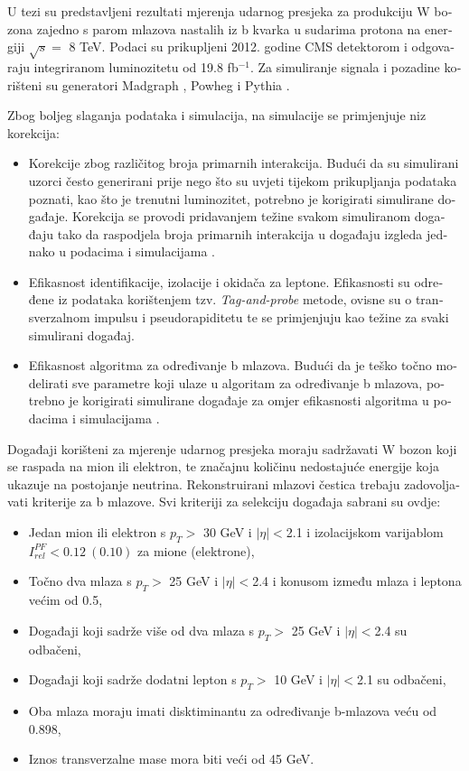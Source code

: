 \begin{otherlanguage}{croatian}
U tezi su predstavljeni rezultati mjerenja udarnog presjeka za produkciju W bozona zajedno s parom mlazova nastalih iz b kvarka u sudarima protona na energiji $\sqrt{s}=$ 8 TeV. Podaci su prikupljeni 2012. godine CMS detektorom i odgovaraju integriranom luminozitetu od 19.8 fb$^{-1}$. Za simuliranje signala i pozadine korišteni su generatori Madgraph \cite{Alwall:2011uj}, Powheg \cite{Oleari:2010nx} i Pythia \cite{Sjostrand:2006za}. 
\par Zbog boljeg slaganja podataka i simulacija, na simulacije se primjenjuje niz korekcija:
\begin{itemize}
\item Korekcije zbog različitog broja primarnih interakcija. Budući da su simulirani uzorci često generirani prije nego što su uvjeti tijekom prikupljanja podataka poznati, kao što je trenutni luminozitet, potrebno je korigirati simulirane događaje. Korekcija se provodi pridavanjem težine svakom simuliranom događaju tako da raspodjela broja primarnih interakcija u događaju izgleda jednako u podacima i simulacijama \cite{CMS:2013wea}.
\item Efikasnost identifikacije, izolacije i okidača za leptone. Efikasnosti su određene iz podataka korištenjem tzv. \textit{Tag-and-probe} metode, ovisne su o transverzalnom impulsu i pseudorapiditetu te se primjenjuju kao težine za svaki simulirani događaj.
\item Efikasnost algoritma za određivanje b mlazova. Budući da je teško točno modelirati sve parametre koji ulaze u algoritam za određivanje b mlazova, potrebno je korigirati simulirane događaje za omjer efikasnosti algoritma u podacima i simulacijama \cite{CMS:2013vea}.
\end{itemize}
\par Događaji korišteni za mjerenje udarnog presjeka moraju sadržavati W bozon koji se raspada na mion ili elektron, te značajnu količinu nedostajuće energije koja ukazuje na postojanje neutrina. Rekonstruirani mlazovi čestica trebaju zadovoljavati kriterije za b mlazove. Svi kriteriji za selekciju događaja sabrani su ovdje:
\begin{itemize}
\item Jedan mion ili elektron s $p_T>$ 30 GeV i $|\eta|<$2.1  i izolacijskom varijablom $I_{rel}^{PF}<0.12\ (0.10)$ za mione (elektrone),
\item Točno dva mlaza s $p_T>$ 25 GeV i $|\eta|<$2.4 i konusom između mlaza i leptona većim od 0.5,
\item Događaji koji sadrže više od dva mlaza s $p_T>$ 25 GeV i $|\eta|<$2.4 su odbačeni,
\item Događaji koji sadrže dodatni lepton s $p_T>$ 10 GeV i $|\eta|<$2.1 su odbačeni,
\item Oba mlaza moraju imati disktiminantu za određivanje b-mlazova veću od 0.898,
\item Iznos transverzalne mase mora biti veći od 45 GeV.
\end{itemize}  


\end{otherlanguage}
